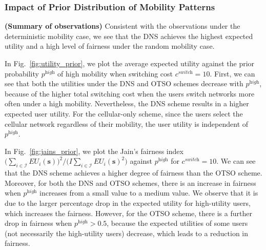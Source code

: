\documentclass[journal]{IEEEtran}
\newcommand{\mc}[1]{\mathcal{#1}}
\newcommand{\bs}[1]{\boldsymbol{#1}}
\begin{document}
\subsubsection{Impact of Prior Distribution of Mobility Patterns} \label{sec:prior}

  \textbf{(Summary of observations)} Consistent with the observations under the deterministic mobility case, we see that the DNS achieves the highest expected utility and a high level of fairness under the random mobility case.

	In Fig.~\ref{fig:utility_prior}, we plot the average expected utility against the prior probability $p^{\textit{high}}$ of high mobility when switching cost $c^{\textit{switch}} = 10$. 
	First, we can see that both the utilities under the DNS and OTSO schemes decrease with $p^{\textit{high}}$,  because of the higher total switching cost when the users switch networks more often under a high mobility.
	Nevertheless, the DNS scheme results in a higher expected user utility.
	For the cellular-only scheme, since the users select the cellular network regardless of their mobility, the user utility is independent of $p^{\textit{high}}$. 
		
		
	In Fig.~\ref{fig:jains_prior}, we plot the Jain's fairness index \cite{jain_aq84} $\bigl( \sum_{i \in \mathcal{I}} EU_i(\boldsymbol{s}) \bigr)^2 / \bigl( I \sum_{i \in \mathcal{I}} EU_i(\boldsymbol{s})^2 \bigr)$ against $p^{\textit{high}}$ for $c^{\textit{switch}} = 10$. 
	We can see that the DNS scheme achieves a higher degree of fairness than the OTSO scheme.
	Moreover, for both the DNS and OTSO schemes, there is an increase in fairness when $p^{\textit{high}}$ increases from a small value to a medium value. We observe that it is due to the larger percentage drop in the expected utility for high-utility users, which increases the fairness.
	However, for the OTSO scheme, there is a further drop in fairness when $p^{\textit{high}} > 0.5$, because the expected utilities of some users (not necessarily the high-utility users) decrease, which leads to a reduction in fairness.


\end{document}
